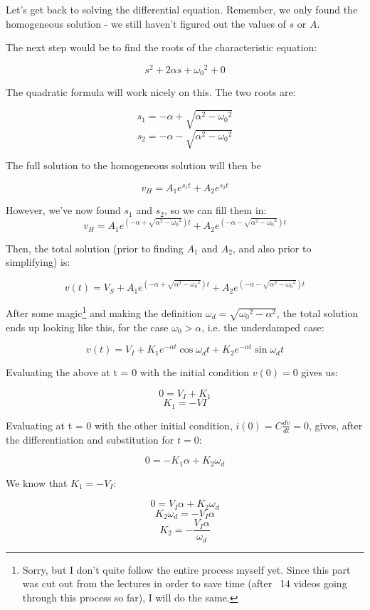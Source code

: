 \documentclass[12pt,a4paper]{report}
\begin{document}
Let's get back to solving the differential equation. Remember, we only found the homogeneous solution - we still haven't figured out the values of $s$ or $A$.

The next step would be to find the roots of the characteristic equation:

\[ s^2 + 2\alpha s + {\omega_0}^2 + 0 \]

The quadratic formula will work nicely on this. The two roots are:

\[ s_1 = -\alpha + \sqrt{\alpha^2 - {\omega_0}^2} \]
\[ s_2 = -\alpha - \sqrt{\alpha^2 - {\omega_0}^2} \]

The full solution to the homogeneous solution will then be

\[ v_H = A_1 e^{s_1 t} + A_2 e^{s_2 t} \]

However, we've now found $s_1$ and $s_2$, so we can fill them in:
\large
\[ v_H = A_1 e^{(-\alpha + \sqrt{\alpha^2 - {\omega_0}^2}) t} + A_2 e^{(-\alpha - \sqrt{\alpha^2 - {\omega_0}^2}) t} \]
\normalsize

Then, the total solution (prior to finding $A_1$ and $A_2$, and also prior to simplifying) is:

\[ v(t) = V_S + A_1 e^{(-\alpha + \sqrt{\alpha^2 - {\omega_0}^2}) t} + A_2 e^{(-\alpha - \sqrt{\alpha^2 - {\omega_0}^2}) t} \]

After some magic\footnote{Sorry, but I don't quite follow the entire process myself yet. Since this part was cut out from the lectures in order to save time (after ~14 videos going through this process so far), I will do the same.} and making the definition $\omega_d = \sqrt{{\omega_0}^2 - \alpha^2}$, the total solution ends up looking like this, for the case $\omega_0 > \alpha$, i.e. the underdamped case:

\[ v(t) = V_I + K_1 e^{-\alpha t} \cos{\omega_d t} + K_2 e^{-\alpha t} \sin{\omega_d t} \]

Evaluating the above at t = 0 with the initial condition $v(0) = 0$ gives us:

\[ 0 = V_I + K_1 \]
\[ K_1 = -VI \]

Evaluating at t = 0 with the other initial condition, $\displaystyle i(0) = C \frac{dv}{dt} = 0$, gives, after the differentiation and substitution for $t = 0$:

\[ 0 = -K_1 \alpha + K_2 \omega_d \]

We know that $K_1 = -V_I$:

\[ 0 = V_I \alpha + K_2 \omega_d \]
\[ K_2 \omega_d = -V_I \alpha \]
\[ K_2 = -\frac{V_I \alpha}{\omega_d} \]
\end{document}
